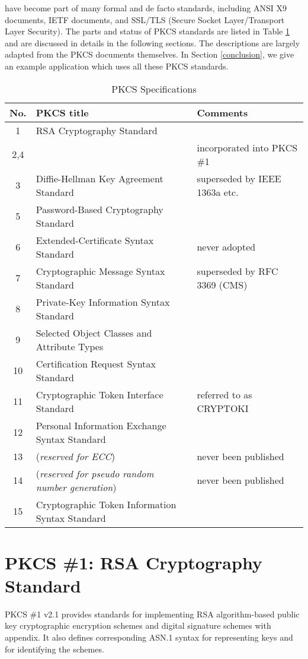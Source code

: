 \documentclass{article}
\begin{document}
have become part of many formal and de facto standards, including
ANSI X9 documents, IETF documents, 
and SSL/TLS (Secure Socket Layer/Transport Layer Security).
The parts and status of PKCS standards are listed in Table \ref{pkcstable}
and are discussed in details in the following sections.
The descriptions are largely adapted from the PKCS documents themselves.
In Section \ref{conclusion}, we give an example application which
uses all these PKCS standards.
{\small \begin{center}
\begin{table}[htb]
\caption{PKCS Specifications}
\label{pkcstable}
\begin{center}
\begin{tabular}{|c|l|l|} \hline
{\bf No.} & {\bf PKCS title} & {\bf Comments}\\ \hline
1 & RSA Cryptography Standard & \\ \hline
2,4 & & incorporated into  PKCS \#1\\ \hline
3 & Diffie-Hellman Key Agreement Standard & superseded by 
        IEEE 1363a etc.\\ \hline
5 & Password-Based Cryptography Standard & \\ \hline
6 & Extended-Certificate Syntax Standard & never adopted \\ \hline 
7 & Cryptographic Message Syntax Standard & superseded by 
        RFC 3369 (CMS) \\ \hline
8 & Private-Key Information Syntax Standard & \\ \hline
9 & Selected Object Classes and Attribute Types & \\ \hline
10& Certification Request Syntax Standard & \\ \hline
11& Cryptographic Token Interface Standard & referred to as CRYPTOKI\\ \hline
12& Personal Information Exchange Syntax Standard& \\ \hline
13& ({\em reserved for ECC}) & never been published\\ \hline
14& ({\em reserved for pseudo random number generation}) & 
        never been published\\ \hline
15& Cryptographic Token Information Syntax Standard& \\ \hline
\end{tabular}
\end{center}
\end{table}
\end{center}
}


\section{PKCS \#1: RSA Cryptography Standard}
\label{pkcs1}
PKCS \#1 v2.1 provides standards for implementing RSA algorithm-based
public key cryptographic encryption schemes and digital signature 
schemes with appendix. It also defines corresponding 
ASN.1 syntax for representing keys and for identifying the schemes.
\end{document}
